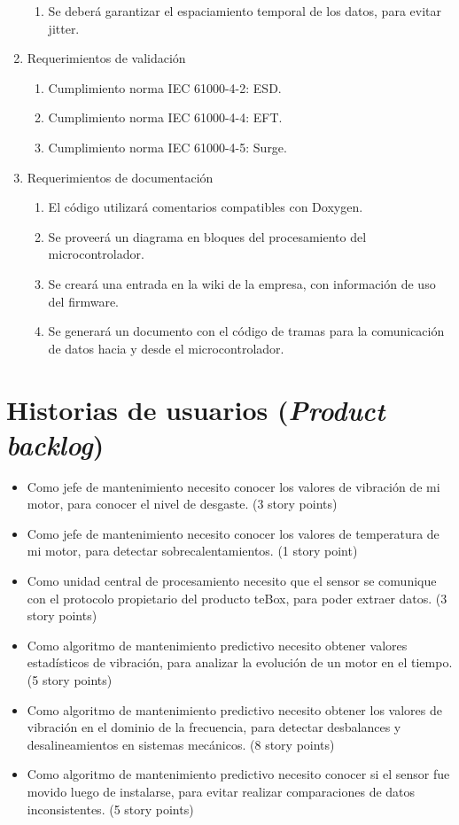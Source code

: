 \documentclass[11pt]{charter}
\begin{document}
\begin{enumerate}
\begin{enumerate}
	\item Se deberá garantizar el espaciamiento temporal de los datos, para evitar jitter.
	\end{enumerate}
\item Requerimientos de validación
	\begin{enumerate}
	\item Cumplimiento norma IEC 61000-4-2: ESD.
	\item Cumplimiento norma IEC 61000-4-4: EFT.
	\item Cumplimiento norma IEC 61000-4-5: Surge.
	\end{enumerate}
\item Requerimientos de documentación
	\begin{enumerate}
	\item El código utilizará comentarios compatibles con Doxygen.
	\item Se proveerá un diagrama en bloques del procesamiento del microcontrolador.
	\item Se creará una entrada en la wiki de la empresa, con información de uso del firmware.
	\item Se generará un documento con el código de tramas para la comunicación de datos hacia y desde el microcontrolador.
	\end{enumerate}
\end{enumerate}


\section{Historias de usuarios (\textit{Product backlog})}
\label{sec:backlog}

\begin{itemize}
\item Como jefe de mantenimiento necesito conocer los valores de vibración de mi motor, para conocer el nivel de desgaste. (3 story points)
\item Como jefe de mantenimiento necesito conocer los valores de temperatura de mi motor, para detectar sobrecalentamientos. (1 story point)
\item Como unidad central de procesamiento necesito que el sensor se comunique con el protocolo propietario del producto teBox, para poder extraer datos. (3 story points)
\item Como algoritmo de mantenimiento predictivo necesito obtener valores estadísticos de vibración, para analizar la evolución de un motor en el tiempo. (5 story points)
\item Como algoritmo de mantenimiento predictivo necesito obtener los valores de vibración en el dominio de la frecuencia, para detectar desbalances y desalineamientos en sistemas mecánicos. (8 story points)
\item Como algoritmo de mantenimiento predictivo necesito conocer si el sensor fue movido luego de instalarse, para evitar realizar comparaciones de datos inconsistentes. (5 story points)
\end{itemize}
\end{document}
